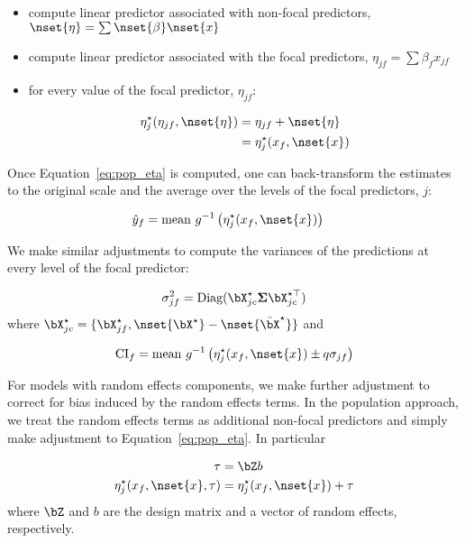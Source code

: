 \begin{itemize}
\item compute linear predictor associated with non-focal predictors, $\nset{\eta} = \sum \nset{\beta} \nset{x}$
\item compute linear predictor associated with the focal predictors, $\eta_{jf} = \sum{\beta_f x_{jf}}$
\item for every value of the focal predictor, $\eta_{jf}$:

\begin{align}\label{eq:pop_eta} 
\eta_j^\star(\eta_{jf}, \nset{\eta})  &= \eta_{jf} + \nset{\eta} \nonumber \\
&= \eta_j^\star(x_f, \nset{x})
\end{align}
\end{itemize}

Once Equation~\ref{eq:pop_eta} is computed, one can back-transform the estimates to the original scale and the average over the levels of the focal predictors, $j$:

\begin{align}\label{eq:pop_response} 
\hat{y}_f  &= \textrm{mean} ~ g^{-1} \left(\eta_j^\star(x_f, \nset{x})\right)
\end{align}

We make similar adjustments to compute the variances of the predictions at every level of the focal predictor:

\begin{align}
\sigma_{jf}^2 = \textrm{Diag}(\bX^\star_{jc} \boldsymbol{\Sigma} \bX^{\star\top}_{jc})
\end{align}
where $\bX^{\star}_{jc} = \{\bX_{jf}^\star, \nset{{\bX}^\star} - \nset{{\bar{\bX}}^\star}\}$ and 

\begin{align}
\mathrm{CI}_f = \mathrm{mean} ~ g^{-1} \left(\eta_j^\star(x_f, \nset{x}) \pm q\sigma_{jf}\right)
\end{align}

For models with random effects components, we make further adjustment to correct for bias induced by the random effects terms. In the population approach, we treat the random effects terms as additional non-focal predictors and simply make adjustment to Equation~\ref{eq:pop_eta}. In particular

\begin{align}\label{eq:pop_eta_re} 
\tau &= \bZ b \nonumber \\
\eta_j^\star(x_f, \nset{x}, \tau)  &= \eta_j^\star(x_f, \nset{x}) + \tau
\end{align}
where $\bZ$ and $b$ are the design matrix and a vector of random effects, respectively.


